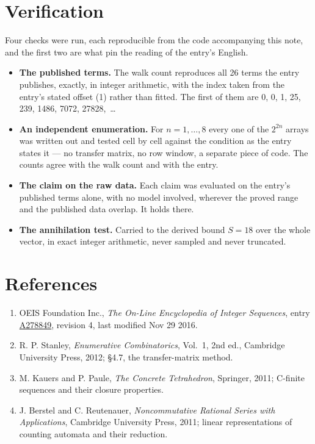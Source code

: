 \documentclass[11pt]{article}
\theoremstyle{definition}
\begin{document}
\section{Verification}

Four checks were run, each reproducible from the code accompanying this note, and the first two are what pin the reading of the entry's English.

\begin{itemize}

\item {\bfseries The published terms.} The walk count reproduces all 26 terms the entry publishes, exactly, in integer arithmetic, with the index taken from the entry's stated offset (1) rather than fitted. The first of them are 0, 0, 1, 25, 239, 1486, 7072, 27828,~\dots

\item {\bfseries An independent enumeration.} For $n = 1,\dots,8$ every one of the $2^{2n}$ arrays was written out and tested cell by cell against the condition as the entry states it --- no transfer matrix, no row window, a separate piece of code. The counts agree with the walk count and with the entry.

\item {\bfseries The claim on the raw data.} Each claim was evaluated on the entry's published terms alone, with no model involved, wherever the proved range and the published data overlap. It holds there.

\item {\bfseries The annihilation test.} Carried to the derived bound $S = 18$ over the whole vector, in exact integer arithmetic, never sampled and never truncated.

\end{itemize}

\section{References}

\begin{enumerate}

\item OEIS Foundation Inc., \emph{The On-Line Encyclopedia of Integer Sequences}, entry \href{https://oeis.org/A278849}{A278849}, revision 4, last modified Nov 29 2016.

\item R. P. Stanley, \emph{Enumerative Combinatorics}, Vol.~1, 2nd ed., Cambridge University Press, 2012; \S4.7, the transfer-matrix method.

\item M. Kauers and P. Paule, \emph{The Concrete Tetrahedron}, Springer, 2011; C-finite sequences and their closure properties.

\item J. Berstel and C. Reutenauer, \emph{Noncommutative Rational Series with Applications}, Cambridge University Press, 2011; linear representations of counting automata and their reduction.

\end{enumerate}
\end{document}
